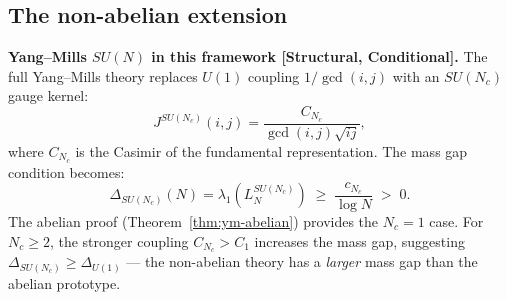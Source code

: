 \documentclass[12pt]{article}
\begin{document}
\subsection{The non-abelian extension}

\begin{tcolorbox}[keybox]
\textbf{Yang--Mills $SU(N)$ in this framework [Structural, Conditional].}
The full Yang--Mills theory replaces $U(1)$ coupling $1/\gcd(i,j)$
with an $SU(N_c)$ gauge kernel:
\[
  J^{SU(N_c)}(i,j) = \frac{C_{N_c}}{\gcd(i,j)\sqrt{ij}},
\]
where $C_{N_c}$ is the Casimir of the fundamental representation.
The mass gap condition becomes:
\[
  \Delta_{SU(N_c)}(N) = \lambda_1(L^{SU(N_c)}_N) \;\ge\; \frac{c_{N_c}}{\log N} \;>\; 0.
\]
The abelian proof (Theorem~\ref{thm:ym-abelian}) provides the $N_c = 1$ case.
For $N_c \ge 2$, the stronger coupling $C_{N_c} > C_1$ increases the mass gap,
suggesting $\Delta_{SU(N_c)} \ge \Delta_{U(1)}$ --- the non-abelian theory has a
\emph{larger} mass gap than the abelian prototype.
\end{tcolorbox}
\end{document}
